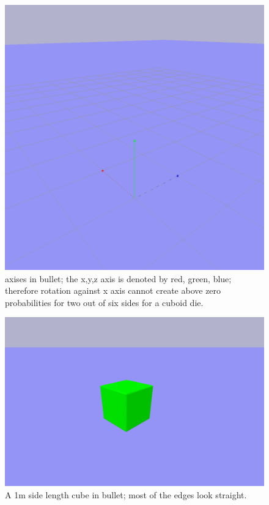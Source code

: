 \begin{figure}[h]
\center
\includegraphics[scale=0.8]{bullet_axis.png}
\caption{axises in bullet; the x,y,z axis is denoted by red, green, blue; therefore rotation against x axis cannot create above zero probabilities for two out of six sides for a cuboid die.}
\label{fig:square_p}
\end{figure}
\begin{figure}[h]
\center
\includegraphics[scale=0.5]{normal_cuboid.png}
\caption{A 1m side length cube in bullet; most of the edges look straight.}
\label{fig:square_p}
\end{figure}\\\\
